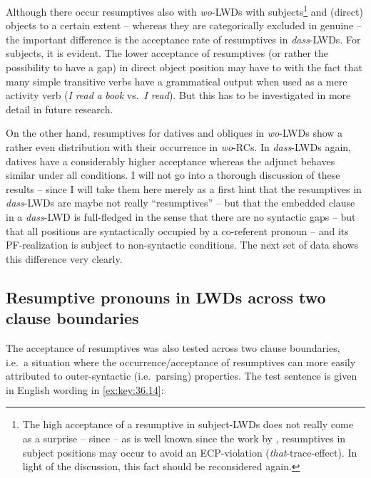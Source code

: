 \documentclass[output=paper]{langsci/langscibook}
\begin{document}
\largerpage
Although there occur resumptives also with \emph{wo}-\glspl{LWD} with
subjects\footnote{The high acceptance of a resumptive in subject-\glspl{LWD} does not
    really come as a surprise – since – as is well known since the work by
    \citet{Engdahl1985}, resumptives in subject positions may occur to avoid an
    \gls{ECP}-violation (\emph{that}-trace-effect). In light of the discussion, this fact should
be reconsidered again.}  and (direct) objects to a certain extent – whereas
they are categorically excluded in genuine  – the important
difference is the acceptance rate of resumptives in \emph{dass}-\glspl{LWD}. For
subjects, it is evident. The lower acceptance of resumptives (or rather the
possibility to have a gap) in direct object position may have to with the fact
that many simple transitive verbs have a grammatical output when used as a mere
activity verb (\emph{I} \emph{read} \emph{a} \emph{book} vs.\ \emph{I}
\emph{read}). But this has to be investigated in more detail in future
research.

On the other hand, resumptives for datives and obliques in \emph{wo}-\glspl{LWD} show
a rather even distribution with their occurrence in \emph{wo}-\glspl{RC}. In
\emph{dass}-\glspl{LWD} again, datives have a considerably higher acceptance whereas
the adjunct behaves similar under all conditions. I will not go into a thorough
discussion of these results – since I will take them here merely as a first
hint that the resumptives in \emph{dass}-\glspl{LWD} are maybe not really
\enquote{resumptives} – but that the embedded clause in a \emph{dass}-\gls{LWD} is
full-fledged in the sense that there are no syntactic gaps – but that all
positions are syntactically occupied by a co-referent pronoun -- and its
PF-realization is subject to non-syntactic conditions. The next set of data
shows this difference very clearly.

\subsection{Resumptive pronouns in LWDs across two clause
boundaries}\label{sub:36.3.3}

The acceptance of resumptives was also tested across two clause boundaries,
i.e.\ a situation where the occurrence/acceptance of resumptives can more
easily attributed to outer-syntactic (i.e.\ parsing) properties. The test
sentence is given in English wording in \eqref{ex:key:36.14}:
\end{document}
